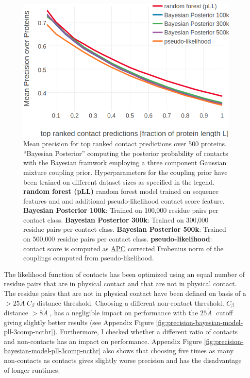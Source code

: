 \documentclass[11pt,a4paper,twoside]{book}
\newcommand{\Cb}{C_\beta}
\newcommand{\angstrom}{\mathring{A} \;}
\theoremstyle{definition}
\theoremstyle{definition}
\theoremstyle{remark}
\begin{document}
\begin{figure}

{\centering \includegraphics[width=0.9\linewidth]{img/bayesian_model/benchmark/precision_vs_rank_pll_3comp_all_datasets} 

}

\caption{Mean precision for top
ranked contact predictions over 500 proteins. ``Bayesian Posterior''
computing the posterior probability of contacts with the Bayesian
framwork employing a three component Gaussian mixture coupling prior.
Hyperparameters for the coupling prior have been trained on different
dataset sizes as specified in the legend. \textbf{random forest (pLL)}
random forest model trained on sequence features and and additional
pseudo-likelihood contact score feature. \textbf{Bayesian Posterior
100k}: Trained on 100,000 residue pairs per contact class.
\textbf{Bayesian Posterior 300k}: Trained on 300,000 residue pairs per
contact class. \textbf{Bayesian Posterior 500k}: Trained on 500,000
residue pairs per contact class. \textbf{pseudo-likelihood}: contact
score is computed as \protect\hyperlink{abbrev}{APC} corrected Frobenius
norm of the couplings computed from pseudo-likelihood.}\label{fig:precision-bayesian-model-pll-3comp}
\end{figure}

The likelihood function of contacts has been optimized using an equal
number of residue pairs that are in physical contact and that are not in
physical contact. The residue pairs that are not in physical contact
have been defined on basis of a \(>25 \angstrom \Cb\) distance
threshold. Choosing a different non-contact threshold, \(\Cb\) distance
\(>8 \angstrom\), has a negligible impact on performance with the
\(25 \angstrom\) cutoff giving slightly better results (see Appendix
Figure \ref{fig:precision-bayesian-model-pll-3comp-ncthr}). Furthermore,
I checked whether a different ratio of contacts and non-contacts has an
impact on performance. Appendix Figure
\ref{fig:precision-bayesian-model-pll-3comp-ncthr} also shows that
choosing five times as many non-contacts as contacts gives slightly
worse precision and has the disadvantage of longer runtimes.
\end{document}
